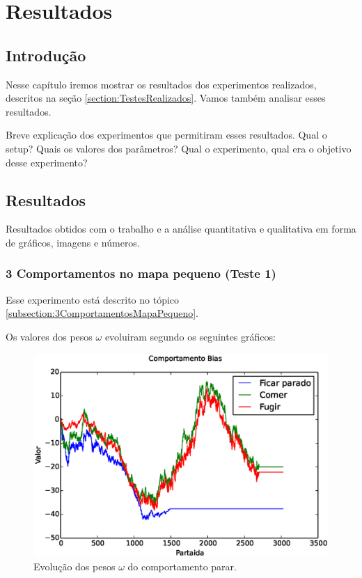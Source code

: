 


\chapter{Resultados\label{chap:Resultados}}



\section{Introdução}

Nesse capítulo iremos mostrar os resultados dos experimentos realizados, descritos na seção \ref{section:TestesRealizados}. Vamos também analisar esses resultados.

Breve explicação dos experimentos que permitiram esses resultados.
Qual o setup? Quais os valores dos parâmetros? Qual o experimento,
qual era o objetivo desse experimento?


\section{Resultados}

Resultados obtidos com o trabalho e a análise quantitativa e qualitativa
em forma de gráficos, imagens e números.

\subsection{3 Comportamentos no mapa pequeno (Teste 1)}

Esse experimento está descrito no tópico \ref{subsection:3ComportamentosMapaPequeno}.

Os valores dos pesos $ \omega $ evoluiram segundo os seguintes gráficos:

\begin{figure}[H]
    \centering
    \includegraphics[width=120mm]{images/3_behaviors_small_map/weights____pol__Bias}
    \caption{\label{img:3ComportamentosMapaPequeno:ComportamentoParar}Evolução dos pesos $ \omega $ do comportamento parar.}
\end{figure}

